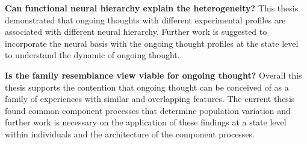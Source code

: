 \textbf{Can functional neural hierarchy explain the heterogeneity?} This thesis demonstrated that ongoing thoughts with different experimental profiles are associated with different neural hierarchy. Further work is suggested to incorporate the neural basis with the ongoing thought profiles at the state level to understand the dynamic of ongoing thought.

\textbf{Is the family resemblance view viable for ongoing thought?} Overall this thesis supports the contention that ongoing thought can be conceived of as a family of experiences with similar and overlapping features. The current thesis found common component processes that determine population variation and further work is necessary on the application of these findings at a state level within individuals and the architecture of the component processes.